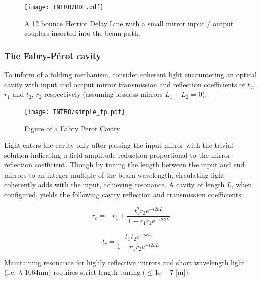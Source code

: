 \begin{figure}[ht!]
	\centering
	\texttt{[image: INTRO/HDL.pdf]}
	\caption{A 12 bounce Herriot Delay Line with a small mirror input / output couplers inserted into the beam path.}
	\label{fig:hdlcav}
\end{figure}

\subsubsection{The Fabry-P\'{e}rot cavity}
\label{sec:FPC}
To inform of a folding mechanism, consider coherent light encountering an optical cavity with input and output mirror transmission and reflection coefficients of $t_1$, $r_1$ and $t_2$, $r_2$ respectively (assuming lossless mirrors $L_1 + L_2=0$).

\begin{figure}[h!]
	\centering
	\texttt{[image: INTRO/simple\_fp.pdf]}
	\caption{Figure of a Fabry Perot Cavity}
	\label{fig:fpcav}
\end{figure}

Light enters the cavity only after passing the input mirror with the trivial solution indicating a field amplitude reduction proportional to the mirror reflection coefficient. Though by tuning the length between the input and end mirrors to an integer multiple of the beam wavelength, circulating light coherently adds with the input, achieving resonance.  A cavity of length $L$, when configured, yields the following cavity reflection and transmission coefficients: 

\begin{equation}
	r_c = -r_1 + \frac{t^2_1r_2 e^{-i2kL}}{1-r_1 r_2 e^{-i2kL}}
\end{equation}

\begin{equation}
	t_c = \frac{t_1 t_2 e^{-ikL}}{1-r_1 r_2 e^{-i2kL}}	
\end{equation}

Maintaining resonance for highly reflective mirrors and short wavelength light (i.e. $\lambda$ 1064nm) requires strict length tuning ($\leq 1\mathrm{e-}7$ [m]). 

